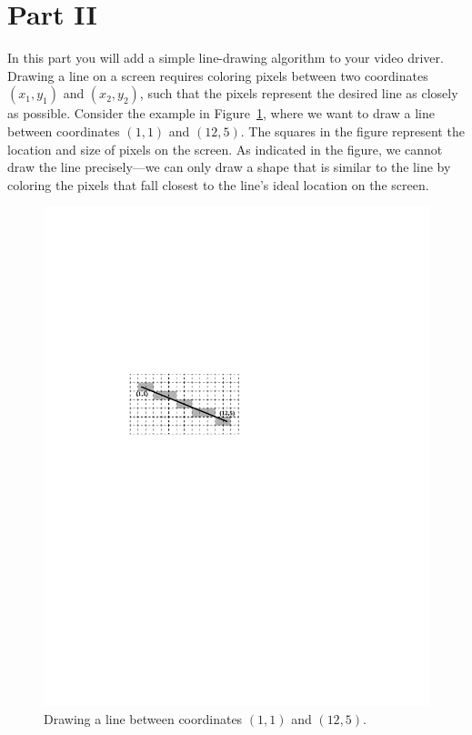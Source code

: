 \documentclass[epsfig,10pt,fullpage]{article}
\begin{document}
\vspace{-1cm}
\section*{Part II}

\noindent
In this part you will add a simple line-drawing algorithm to your video driver.
Drawing a line on a screen requires coloring pixels between two coordinates $(x_1,y_1)$ and 
$(x_2,y_2)$, such that the pixels represent the desired line as closely as possible. Consider 
the example in Figure~\ref{fig:line_drawing}, where we want to draw a line between 
coordinates $(1,1)$ and $(12,5)$. The squares in the figure represent the location and 
size of pixels on the screen. As indicated in the figure, we cannot draw the line 
precisely---we can only draw a shape that is similar to the line by coloring the pixels that 
fall closest to the line's ideal location on the screen.

\begin{figure}[h!]
   \begin{center}
			  \includegraphics[scale=0.8]{figures/fig_line_drawing}
   \end{center}
   \caption{Drawing a line between coordinates $(1,1)$ and $(12,5)$.}
	\label{fig:line_drawing}
\end{figure}
\end{document}
